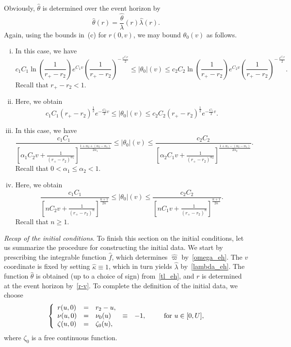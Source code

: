 \documentclass[a4paper,11pt,oneside,reqno]{amsart}
\begin{document}
Obviously, $\hat{\theta}$ is determined over the event horizon by
\begin{equation}
\label{t_eh}
\hat{\theta}(r)=\hat{\frac{\theta}{\lambda}}(r)\hat{\lambda}(r).
\end{equation}
Again, using the bounds in~(c) for $r(0,v)$, we may
bound $\theta_0(v)$ as follows.
\begin{enumerate}[(i)]
\item
In this case, we have
$$
c_1C_1\ln\left({\textstyle\frac{1}{r_+-r_2}}\right)e^{C_1v}
\left({\textstyle\frac{1}{r_+-r_2}}\right)^{-\,\frac{e^{C_2v}}{2}}\leq
|\theta_0|(v)\leq c_2C_2\ln\left({\textstyle\frac{1}{r_+-r_2}}\right)e^{C_2v}
\left({\textstyle\frac{1}{r_+-r_2}}\right)^{-\,\frac{e^{C_1v}}{2}}.
$$
Recall that $r_+-r_2<1$.
\item
Here, we obtain
\begin{equation}\label{theta_ii}
c_1C_1(r_+-r_2)^{\frac{1}{2}}e^{-\frac{C_2}{2}v}\leq|\theta_0|(v)\leq c_2C_2(r_+-r_2)^{\frac{1}{2}}e^{-\frac{C_1}{2}v}.
\end{equation}
\item
In this case, we have
\begin{equation}\label{theta_iii}
\frac{c_1C_1}{\left[\alpha_1C_2v+
\frac{1}{(r_+-r_2)^{\alpha_1}}
\right]^{\frac{1+\alpha_2+(\alpha_2-\alpha_1)}{2\alpha_1}}}
\leq
|\theta_0|(v)\leq \frac{c_2C_2}{\left[\alpha_2C_1v+
\frac{1}{(r_+-r_2)^{\alpha_2}}
\right]^{\frac{1+\alpha_1-(\alpha_2-\alpha_1)}{2\alpha_2}}}.
\end{equation}
Recall that $0<\alpha_1\leq\alpha_2<1$.
\item
Here, we obtain
$$
\frac{c_1C_1}{\left[nC_2v+
\frac{1}{(r_+-r_2)^{n}}\right]^{\frac{n+1}{2n}}}
\leq
|\theta_0|(v)\leq \frac{c_2C_2}{\left[nC_1v+
\frac{1}{(r_+-r_2)^{n}}\right]^{\frac{n+1}{2n}}}.
$$
Recall that $n\geq 1$.
\end{enumerate}

\vspace{6mm}

{\em Recap of the initial conditions}.
To finish this section on the initial conditions, let us summarize the procedure for constructing the initial data.
We start by prescribing the integrable function $\hat f$, which determines
$\hat\varpi$ by~\eqref{omega_eh}.
The $v$ coordinate is fixed by setting $\hat\kappa \equiv 1$,
which in turn yields $\hat\lambda$ by~\eqref{lambda_eh}.
The function $\hat\theta$ is obtained (up to a choice of sign) from~\eqref{tl_eh},
and $r$ is determined at the event horizon by~\eqref{r-v}.
To complete the definition of the initial data, we choose
\begin{equation}
\left\{
\begin{array}{lclcl}
 r(u,0)&=&r_2-u,&&\\
 \nu(u,0)&=&\nu_0(u)&\equiv&-1,\\
 \zeta(u,0)&=&\zeta_0(u),&&
\end{array}
\right.\qquad{\rm for}\ u\in[0,U],
\end{equation}
where $\zeta_0$ is a free continuous function.
\end{document}
